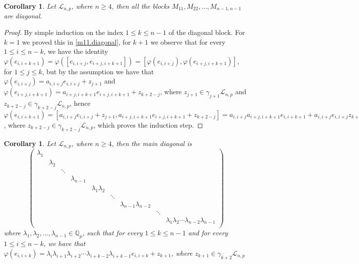 \documentclass[12pt]{article}
\newtheorem{corollary}[theorem]{Corollary}
\begin{document}
\begin{corollary}
\label{main.diagonal.blocks}
Let $\mathcal{L}_{n,p}$, where $n\geq 4$, then all the blocks $M_{11},M_{22},\dots,M_{n-1,n-1}$ are diagonal.
\end{corollary}
\begin{proof}
By simple induction on the index $1\leq k\leq n-1$ of the diagonal block. For $k=1$ we proved this in \ref{m11.diagonal}, for $k+1$ we observe that for every $1\leq i\leq n-k$, we have the identity $\varphi(e_{i,i+k+1})=\varphi([e_{i,i+j},e_{i+j,i+k+1}])=[\varphi(e_{i,i+j}),\varphi(e_{i+j,i+k+1})]$, for $1\leq j\leq k$, but by the assumption we have that $\varphi(e_{i,i+j})=a_{i,i+j}e_{i,i+j}+z_{j+1}$ and $\varphi(e_{i+j,i+k+1})=a_{i+j,i+k+1}e_{i+j,i+k+1}+z_{k+2-j}$, where $z_{j+1}\in\gamma_{j+1}\mathcal{L}_{n,p}$ and $z_{k+2-j}\in\gamma_{k+2-j}\mathcal{L}_{n,p}$, hence $\varphi(e_{i,i+k+1})=[a_{i,i+j}e_{i,i+j}+z_{j+1},a_{i+j,i+k+1}e_{i+j,i+k+1}+z_{k+2-j}]=a_{i,i+j}a_{i+j,i+k+1}e_{i,i+k+1}+a_{i,i+j}e_{i,i+j}z_{k+2-j}+a_{i+j,i+k+1}e_{i+j,i+k+1}z_{j+1}+z_{k+2-j}z_{j+1}=a_{i,i+j}a_{i+j,i+k+1}e_{i,i+k+1}+z_{k+2-j}$, where $z_{k+2-j}\in\gamma_{k+2-j}\mathcal{L}_{n,p}$, which proves the induction step.
\end{proof}
\begin{corollary}
Let $\mathcal{L}_{n,p}$, where $n\geq 4$, then the main diagonal is
\[\begin{pmatrix}
\lambda_1 \\
& \lambda_2  \\
& & \ddots\\
& & & \lambda_{n-1}\\
& & & &\lambda_1\lambda_2\\
& & & & &\ddots\\
& & & & & &\lambda_{n-1}\lambda_{n-2}\\
& & & & & & &\ddots\\
& & & & & & & &\lambda_1\lambda_2\cdots\lambda_{n-2}\lambda_{n-1}\\
\end{pmatrix}\]
where $\lambda_1,\lambda_2,\dots,\lambda_{n-1}\in\mathbb{Q}_p$, such that for every $1\leq k\leq n-1$ and for every $1\leq i\leq n-k$, we have that $\varphi(e_{i,i+k})=\lambda_i\lambda_{i+1}\lambda_{i+2}\cdots\lambda_{i+k-2}\lambda_{i+k-1}e_{i,i+k}+z_{k+1}$, where $z_{k+1}\in\gamma_{k+2}\mathcal{L}_{n,p}$
\end{corollary}
\end{document}
